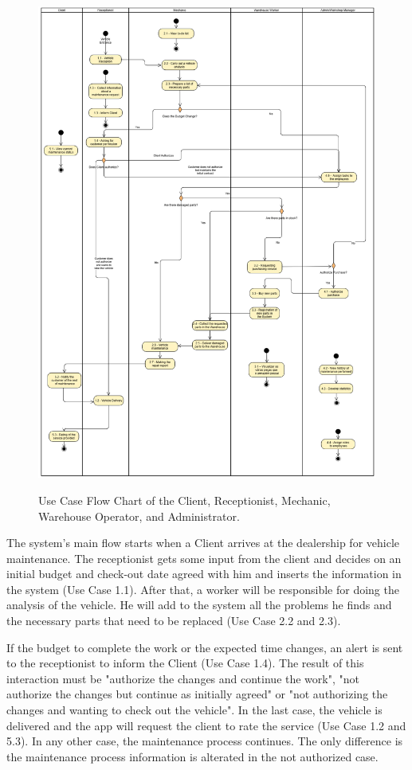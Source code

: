 \begin{figure}[h]
  \caption{Use Case Flow Chart of the Client, Receptionist, Mechanic, Warehouse Operator, and Administrator.}
  \centering
  \includegraphics[width=\textwidth]{figs/UseCaseDiagram}
  \label{fig:figure2}
\end{figure}

The system's main flow starts when a Client arrives at the dealership for vehicle maintenance. 
The receptionist gets some input from the client and decides on an initial budget and check-out date agreed with him and inserts the information in the system (Use Case 1.1).
After that, a worker will be responsible for doing the analysis of the vehicle. 
He will add to the system all the problems he finds and the necessary parts that need to be replaced (Use Case 2.2 and 2.3).


If the budget to complete the work or the expected time changes, an alert is sent to the receptionist to inform the Client (Use Case 1.4). 
The result of this interaction must be "authorize the changes and continue the work", "not authorize the changes but continue as initially agreed" or "not authorizing the changes and wanting to check out the vehicle".
In the last case, the vehicle is delivered and the app will request the client to rate the service (Use Case 1.2 and 5.3). 
In any other case, the maintenance process continues. The only difference is the maintenance process information is alterated in the not authorized case.

